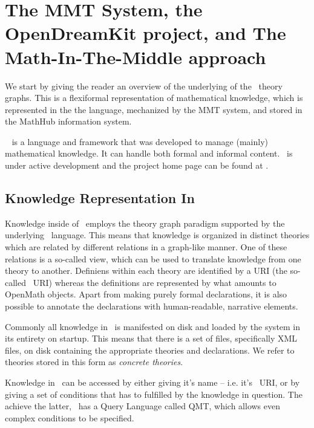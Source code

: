 \section{The MMT System, the OpenDreamKit project, and The Math-In-The-Middle approach}\label{sec:mmtmitm}

We start by giving the reader an overview of the underlying of the \omdocmmt\ theory graphs. 
This is a flexiformal representation of mathematical knowledge, which is represented in the the \omdocmmt language, mechanized by the MMT system, and stored in the MathHub information system. 

\mmt\ \cite{Rabe:MMTLanguageSystem09} is a language and framework that was developed to manage (mainly) mathematical knowledge. 
It can handle both formal and informal content. 
\mmt\ is under active development and the project home page can be found at \cite{uniformal:on}. 

\subsection{Knowledge Representation In \omdocmmt}\label{sec:mmtmitm:kr}

Knowledge inside of \mmt\ employs the theory graph paradigm supported by the underlying \omdocmmt\ language. 
This means that knowledge is organized in distinct theories which are related by different relations in a graph-like manner. 
One of these relations is a so-called view, which can be used to translate knowledge from one theory to another. 
Definiens within each theory are identified by a URI (the so-called \mmt\ URI) whereas the definitions are represented by what amounts to OpenMath \cite{BusCapCar:oms04} objects. 
Apart from making purely formal declarations, it is also possible to annotate the declarations with human-readable, narrative elements. 

Commonly all knowledge in \mmt\ is manifested on disk and loaded by the system in its entirety on startup. 
This means that there is a set of files, specifically XML files, on disk containing the appropriate theories and declarations. 
We refer to theories stored in this form as \textit{concrete theories}. 

Knowledge in \mmt\ can be accessed by either giving it's name -- i.e. it's \mmt\ URI, 
or by giving a set of conditions that has to fulfilled by the knowledge in question. 
The achieve the latter, \mmt\ has a Query Language called QMT, which allows even complex conditions to be specified. 

